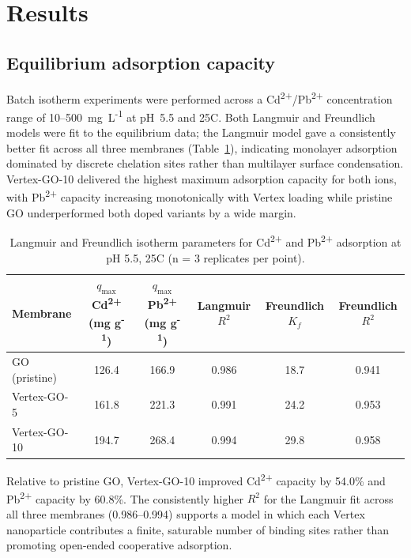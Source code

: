 \section{Results}

\subsection{Equilibrium adsorption capacity}

Batch isotherm experiments were performed across a Cd\textsuperscript{2+}/Pb\textsuperscript{2+} concentration range of 10--500~mg~L\textsuperscript{-1} at pH~5.5 and 25\textdegree C. Both Langmuir and Freundlich models were fit to the equilibrium data; the Langmuir model gave a consistently better fit across all three membranes (Table~\ref{tab:isotherms}), indicating monolayer adsorption dominated by discrete chelation sites rather than multilayer surface condensation. Vertex-GO-10 delivered the highest maximum adsorption capacity for both ions, with Pb\textsuperscript{2+} capacity increasing monotonically with Vertex loading while pristine GO underperformed both doped variants by a wide margin.

\begin{table}[htbp]
\centering
\caption{Langmuir and Freundlich isotherm parameters for Cd\textsuperscript{2+} and Pb\textsuperscript{2+} adsorption at pH 5.5, 25\textdegree C (n = 3 replicates per point).}
\label{tab:isotherms}
\small
\begin{tabular}{lccccc}
\toprule
Membrane & $q_{\max}$ Cd\textsuperscript{2+} (mg g\textsuperscript{-1}) & $q_{\max}$ Pb\textsuperscript{2+} (mg g\textsuperscript{-1}) & Langmuir $R^2$ & Freundlich $K_f$ & Freundlich $R^2$ \\
\midrule
GO (pristine)    & 126.4 & 166.9 & 0.986 & 18.7 & 0.941 \\
Vertex-GO-5      & 161.8 & 221.3 & 0.991 & 24.2 & 0.953 \\
Vertex-GO-10     & 194.7 & 268.4 & 0.994 & 29.8 & 0.958 \\
\bottomrule
\end{tabular}
\end{table}

Relative to pristine GO, Vertex-GO-10 improved Cd\textsuperscript{2+} capacity by 54.0\% and Pb\textsuperscript{2+} capacity by 60.8\%. The consistently higher $R^2$ for the Langmuir fit across all three membranes (0.986--0.994) supports a model in which each Vertex nanoparticle contributes a finite, saturable number of binding sites rather than promoting open-ended cooperative adsorption.

